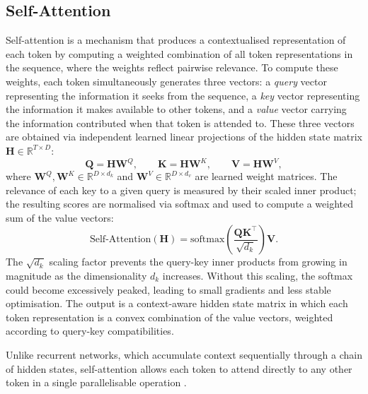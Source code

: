 \subsection{Self-Attention}
\label{subsec:self_attention}

Self-attention is a mechanism that produces a contextualised representation of each token by computing a weighted combination of all token representations in the sequence, where the weights reflect pairwise relevance. To compute these weights, each token simultaneously generates three vectors: a \textit{query} vector representing the information it seeks from the sequence, a \textit{key} vector representing the information it makes available to other tokens, and a \textit{value} vector carrying the information contributed when that token is attended to. These three vectors are obtained via independent learned linear projections of the hidden state matrix $\mathbf{H} \in \mathbb{R}^{T \times D}$:
\begin{equation}
    \mathbf{Q} = \mathbf{H}\mathbf{W}^Q, \qquad
    \mathbf{K} = \mathbf{H}\mathbf{W}^K, \qquad
    \mathbf{V} = \mathbf{H}\mathbf{W}^V,
    \label{eq:qkv_projections}
\end{equation}
where $\mathbf{W}^Q, \mathbf{W}^K \in \mathbb{R}^{D \times d_k}$ and
$\mathbf{W}^V \in \mathbb{R}^{D \times d_v}$ are learned weight matrices. The
relevance of each key to a given query is measured by their scaled inner product;
the resulting scores are normalised via softmax and used to compute a weighted sum
of the value vectors:
\begin{equation}
    \text{Self-Attention}(\mathbf{H}) =
    \text{softmax}\!\left(\frac{\mathbf{Q}\mathbf{K}^\top}{\sqrt{d_k}}\right)\mathbf{V}.
    \label{eq:self_attention}
\end{equation}
The $\sqrt{d_k}$ scaling factor prevents the query-key inner products from growing in magnitude as the dimensionality $d_k$ increases. Without this scaling, the softmax could become excessively peaked, leading to small gradients and less stable optimisation. The output is a context-aware hidden state matrix in which each token representation is a convex combination of the value vectors, weighted according to query-key compatibilities.

Unlike recurrent networks, which accumulate context sequentially through a chain of hidden states, self-attention allows each token to attend directly to any other token in a single parallelisable operation \citep{vaswani2017attention}.

